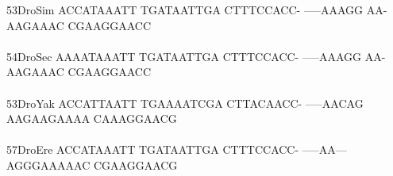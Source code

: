 \documentclass[11pt,twoside,reqno,a4paper]{article}
\begin{document}
{53\hspace*{2\charwidth}DroSim	ACCATAAATT	TGATAATTGA	CTTTCCACC-	-----AAAGG	AA-AAGAAAC	CGAAGGAACC	\\
\hspace*{4\charwidth}\hspace*{7\charwidth}\hspace*{1\charwidth}\hspace*{1\charwidth}\hspace*{1\charwidth}\hspace*{1\charwidth}\hspace*{1\charwidth}\hspace*{1\charwidth}\\
54\hspace*{2\charwidth}DroSec	AAAATAAATT	TGATAATTGA	CTTTCCACC-	-----AAAGG	AA-AAGAAAC	CGAAGGAACC	\\
\hspace*{4\charwidth}\hspace*{7\charwidth}\hspace*{1\charwidth}\hspace*{1\charwidth}\hspace*{1\charwidth}\hspace*{1\charwidth}\hspace*{1\charwidth}\hspace*{1\charwidth}\\
53\hspace*{2\charwidth}DroYak	ACCATTAATT	TGAAAATCGA	CTTACAACC-	-----AACAG	AAGAAGAAAA	CAAAGGAACG	\\
\hspace*{4\charwidth}\hspace*{7\charwidth}\hspace*{1\charwidth}\hspace*{1\charwidth}\hspace*{1\charwidth}\hspace*{1\charwidth}\hspace*{1\charwidth}\hspace*{1\charwidth}\\
57\hspace*{2\charwidth}DroEre	ACCATAAATT	TGATAATTGA	CTTTCCACC-	-----AA---	AGGGAAAAAC	CGAAGGAACG	\\
\hspace*{4\charwidth}\hspace*{7\charwidth}\hspace*{1\charwidth}\hspace*{1\charwidth}\hspace*{1\charwidth}\hspace*{1\charwidth}\hspace*{1\charwidth}\hspace*{1\charwidth}\\
}
\end{document}
